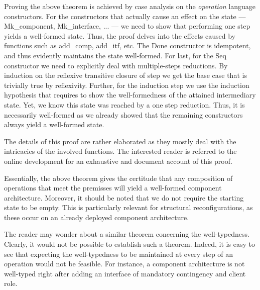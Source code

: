 		Proving the above theorem is achieved by case analysis on the \textit{operation} language constructors. 
	For the constructors that actually cause an effect on the \textsf{state} --- \textsf{Mk\_component}, \textsf{Mk\_interface}, ... ---
	we need to show that performing one \textsf{step} yields a well-formed \textsf{state}.
	Thus, the proof delves into the effects caused by functions such as \textsf{add\_comp}, \textsf{add\_itf}, etc.
    The \textsf{Done} constructor is idempotent, and thus evidently maintains the \textsf{state} well-formed.	
	For last, for the \textsf{Seq} constructor we need to explicitly deal with multiple-steps reductions. By
	induction on the reflexive transitive closure of \textsf{step} we get the base case that is trivially true by reflexivity.
	Further, for the induction step we use the induction hypothesis that requires to show the well-formedness
	of the attained intermediary \textsf{state}. Yet, we know this state was reached by a one \textsf{step} reduction. Thus,
	it is necessarily well-formed as we already showed that the remaining constructors always yield a well-formed state.
		
		The details of this proof are rather elaborated as they mostly deal with the intricacies of the
	involved functions. The interested reader is referred to the online development for an exhaustive
	and document account of this proof.	
	
	
	Essentially, the above theorem gives the certitude that any composition of \textsf{operation}s
  that meet the premisses will yield a well-formed \textsf{component} architecture. Moreover, it should be noted that
  we do not require the starting \textsf{state} to be empty. This is particularly relevant for structural reconfigurations, as these
  occur on an already deployed \textsf{component} architecture.            

		The reader may wonder about a similar theorem concerning the well-typedness.  Clearly, it would not be possible to establish
   	such a theorem. Indeed, it is easy to see that expecting the well-typedness to be maintained at every \textsf{step}
   	of an \textsf{operation} would not be feasible. For instance, a \textsf{component} architecture is not well-typed   	
   	right after adding an \textsf{interface} of \textsf{mandatory}
   	\textsf{contingency} and \textsf{client} \textsf{role}. 
   	
